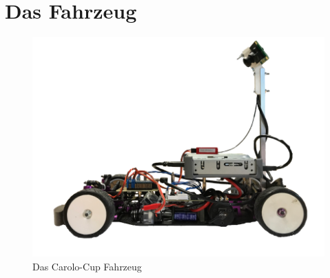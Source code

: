 \section{Das Fahrzeug}


\begin{figure}
	\centering
	\includegraphics[scale=0.3]{figures/Fahrzeug.png}
	\caption{Das Carolo-Cup Fahrzeug}
	\label{img:Carolo-Fahrzeug}
\end{figure}
